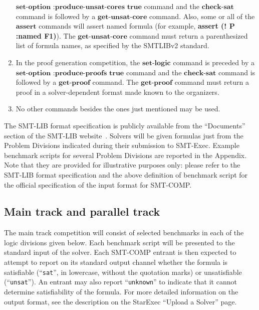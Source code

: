 \documentclass[12pt]{article}
\newcommand{\akey}[1]{\textbf{#1}}
\begin{document}
\begin{enumerate}
$\akey{set-option :produce-unsat-cores true}$ command and the 
$\akey{check-sat}$ command is followed by a $\akey{get-unsat-core}$ command.
Also, some or all of the $\akey{assert}$ commands will assert named formula
(for example, \akey{assert (! P :named F1)}). The $\akey{get-unsat-core}$
command must return a parenthesized list of formula names, as specified by the 
SMTLIBv2 standard.
\item In the proof generation competition, the $\akey{set-logic}$ command is preceded by a \\
$\akey{set-option :produce-proofs true}$ command and the 
$\akey{check-sat}$ command is followed by a $\akey{get-proof}$ command.
The $\akey{get-proof}$ command must return a proof in a solver-dependent format made known to the organizers.
\item No other commands besides the ones just mentioned may be used.

\end{enumerate}

  
\noindent The SMT-LIB format specification is publicly
available from the ``Documents'' section of the SMT-LIB
website~\cite{SMT-LIB}.  Solvers will be given formulas just from the
Problem Divisions indicated during their submission to SMT-Exec.
Example benchmark scripts for several Problem Divisions are reported in the Appendix.
Note that they are provided for illustrative purposes only: 
please refer to the SMT-LIB format specification 
and the above definition of benchmark script for the official specification 
of the input format for SMT-COMP.

\subsection{Main track and parallel track}
\label{sec:exec:main}

The main track competition will consist of selected benchmarks in each of the
logic divisions given below.
Each benchmark script will be presented to the standard input of the solver.
Each SMT-COMP entrant is then expected to attempt to report on its
standard output channel whether the formula is satisfiable
(``\texttt{sat}'', in lowercase, without the quotation marks) or unsatisfiable
(``\texttt{unsat}'').  An entrant may also report ``\texttt{unknown}''
to indicate that it cannot determine satisfiability of the formula.
For more detailed information on the output format, see the
description on the StarExec ``Upload a Solver'' page.  %
\end{document}
